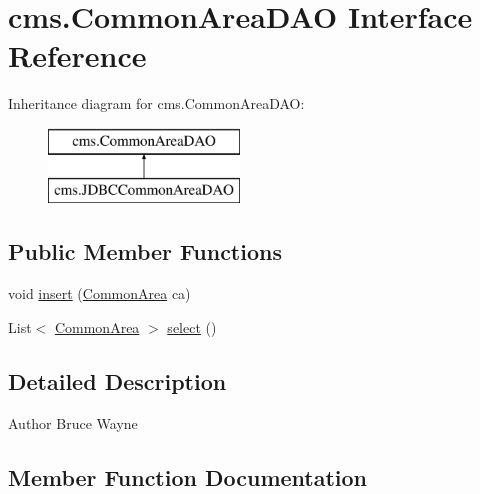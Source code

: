 \hypertarget{interfacecms_1_1_common_area_d_a_o}{}\section{cms.\+Common\+Area\+D\+AO Interface Reference}
\label{interfacecms_1_1_common_area_d_a_o}
Inheritance diagram for cms.\+Common\+Area\+D\+AO\+:\begin{figure}[H]
\begin{center}
\leavevmode
\includegraphics[height=2.000000cm]{interfacecms_1_1_common_area_d_a_o}
\end{center}
\end{figure}
\subsection*{Public Member Functions}
\begin{DoxyCompactItemize}
\item 
void \mbox{\hyperlink{interfacecms_1_1_common_area_d_a_o_affdfddab399e6cb4249b3918962a1a4f}{insert}} (\mbox{\hyperlink{classcms_1_1_common_area}{Common\+Area}} ca)
\item 
List$<$ \mbox{\hyperlink{classcms_1_1_common_area}{Common\+Area}} $>$ \mbox{\hyperlink{interfacecms_1_1_common_area_d_a_o_ae4c9d5d62bc59942fc165f8ff9865542}{select}} ()
\end{DoxyCompactItemize}


\subsection{Detailed Description}
\begin{DoxyAuthor}{Author}
Bruce Wayne 
\end{DoxyAuthor}


\subsection{Member Function Documentation}
\mbox{\label{interfacecms_1_1_common_area_d_a_o_affdfddab399e6cb4249b3918962a1a4f}} 

